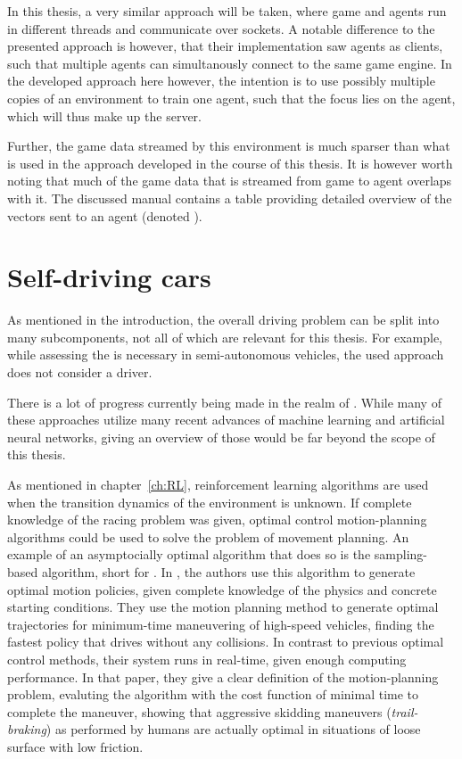 In this thesis, a very similar approach will be taken, where game and agents run in different threads and communicate over sockets. A notable difference to the presented approach is however, that their implementation saw agents as clients, such that multiple agents can simultanously connect to the same game engine. In the developed approach here however, the intention is to use possibly multiple copies of an environment to train one agent, such that the focus lies on the agent, which will thus make up the server. 

Further, the game data streamed by this environment is much sparser than what is used in the approach developed in the course of this thesis. It is however worth noting that much of the game data that is streamed from game to agent overlaps with it. The discussed manual \cite{loiacono_simulated_2013} contains a table providing detailed overview of the vectors sent to an agent (denoted ).

\section{Self-driving cars}

As mentioned in the introduction, the overall driving problem can be split into many subcomponents, not all of which are relevant for this thesis. For example, while assessing the  is necessary in semi-autonomous vehicles, the used approach does not consider a driver. 

There is a lot of progress currently being made in the realm of . While many of these approaches utilize many recent advances of machine learning and artificial neural networks, giving an overview of those would be far beyond the scope of this thesis.

As mentioned in chapter~\ref{ch:RL}, reinforcement learning algorithms are used when the transition dynamics of the environment is unknown. If complete knowledge of the racing problem was given, optimal control motion-planning algorithms could be used to solve the problem of movement planning. An example of an asymptocially optimal algorithm that does so is the sampling-based  algorithm, short for . In \cite{hwan_jeon_anytime_2011}, the authors use this algorithm to generate optimal motion policies, given complete knowledge of the physics and concrete starting conditions. They use the motion planning method to generate optimal trajectories for minimum-time maneuvering of high-speed vehicles, finding the fastest policy that drives without any collisions. In contrast to previous optimal control methods, their system runs in real-time, given enough computing performance. In that paper, they give a clear definition of the motion-planning problem, evaluting the algorithm with the cost function of minimal time to complete the maneuver, showing that aggressive skidding maneuvers (\textit{trail-braking}) as performed by humans are actually optimal in situations of loose surface with low friction.

